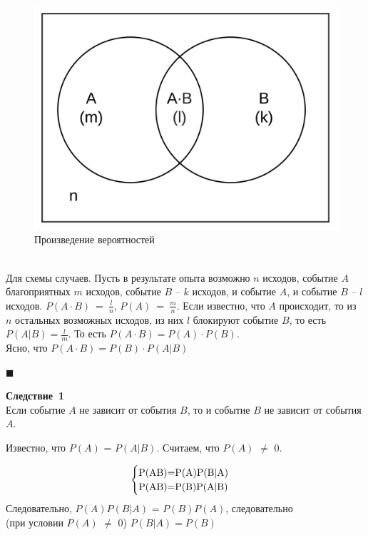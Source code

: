 \documentclass[russian, 12pt, fleqn,x11names]{article}
\begin{document}
\begin{figure}[!h]
\includegraphics[scale=0.3]{Page9.png}
\caption{Произведение вероятностей}
\end{figure}\\
Для схемы случаев. Пусть в результате опыта возможно $n$ исходов, событие $A$ благоприятных $m$ исходов, событие $B$ -- $k$ исходов, и событие $A$, и событие $B$ -- $l$ исходов. $P(A\cdot B)\ =\ \frac{l}{n}$, $P(A)\ =\ \frac{m}{n}$. Если известно, что $A$ происходит, то из $n$ остальных возможных исходов, из них $l$ блокируют событие $B$, то есть  $P(A|B)=\frac{l}{m}$. То есть $P(A\cdot B) = P(A)\cdot P(B)$.\\
Ясно, что $P(A\cdot B) = P(B)\cdot P(A|B)$
\begin{flushright}\(\blacksquare\)\end{flushright}
\textbf{Следствие\ 1}\\Если событие $A$ не зависит от события $B$, то и событие $B$ не зависит от события $A$.
\begin{tabbing}
Известно, что $P(A)$ = $P(A|B)$. Считаем, что $P(A)$ $\neq$ $0$.\\
\end{tabbing}
\begin{equation*} 
 \begin{cases}
   $P(AB)$ = $P(A)P(B|A)$\\
   $P(AB)$ = $P(B)P(A|B)$
 \end{cases}
\end{equation*}
Следовательно, $P(A)P(B|A)$ = $P(B)P(A)$, следовательно\\
(при условии $P(A)$ $\neq$ $0$) $P(B|A)=P(B)$\\
\end{document}
